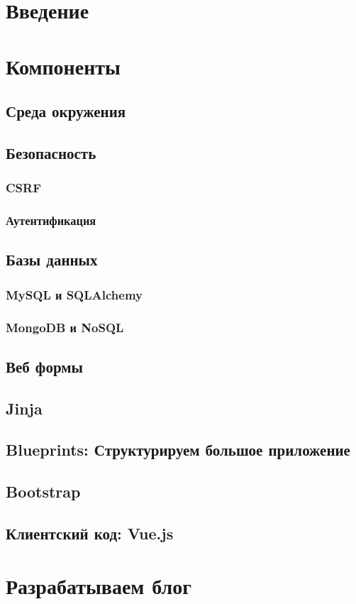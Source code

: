 \chapter*{Введение}

\chapter{Компоненты}

\section{Среда окружения}

\section{Безопасность}

\subsection{CSRF}

\subsection{Аутентификация}

\section{Базы данных}

\subsection{MySQL и SQLAlchemy}

\subsection{MongoDB и NoSQL}

\section{Веб формы}

\section{Jinja}

\section{Blueprints: Структурируем большое приложение}

\section{Bootstrap}

\section{Клиентский код: Vue.js}

\chapter{Разрабатываем блог}

